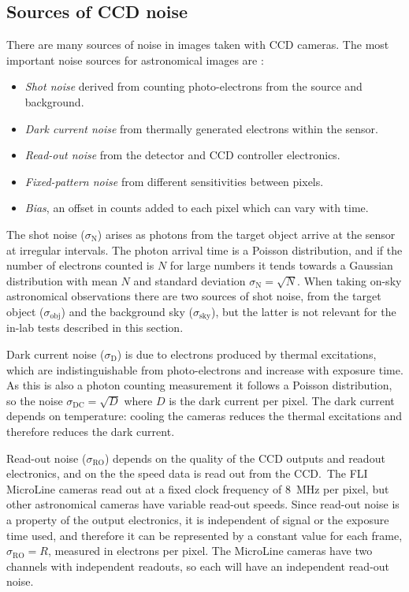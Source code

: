 \subsection{Sources of CCD noise}
\label{sec:noise}
\begin{colsection}

There are many sources of noise in images taken with CCD cameras. The most important noise sources for astronomical images are \citep{CCDs}:
%
\begin{itemize}
    \item \emph{Shot noise} derived from counting photo-electrons from the source and background.
    \item \emph{Dark current noise} from thermally generated electrons within the sensor.
    \item \emph{Read-out noise} from the detector and CCD controller electronics.
    \item \emph{Fixed-pattern noise} from different sensitivities between pixels.
    \item \emph{Bias}, an offset in counts added to each pixel which can vary with time.
\end{itemize}

The shot noise ($\sigma_\text{N}$) arises as photons from the target object arrive at the sensor at irregular intervals. The photon arrival time is a Poisson distribution, and if the number of electrons counted is $N$ for large numbers it tends towards a Gaussian distribution with mean $N$ and standard deviation $\sigma_\text{N} = \sqrt{N}$. When taking on-sky astronomical observations there are two sources of shot noise, from the target object ($\sigma_\text{obj}$) and the background sky ($\sigma_\text{sky}$), but the latter is not relevant for the in-lab tests described in this section.

Dark current noise ($\sigma_\text{D}$) is due to electrons produced by thermal excitations, which are indistinguishable from photo-electrons and increase with exposure time. As this is also a photon counting measurement it follows a Poisson distribution, so the noise $\sigma_\text{DC} = \sqrt{D}$ where $D$ is the dark current per pixel. The dark current depends on temperature: cooling the cameras reduces the thermal excitations and therefore reduces the dark current.

Read-out noise ($\sigma_\text{RO}$) depends on the quality of the CCD outputs and readout electronics, and on the the speed data is read out from the CCD.\ The FLI MicroLine cameras read out at a fixed clock frequency of \SI{8}{\mega\hertz} per pixel, but other astronomical cameras have variable read-out speeds. Since read-out noise is a property of the output electronics, it is independent of signal or the exposure time used, and therefore it can be represented by a constant value for each frame, $\sigma_\text{RO} = R$, measured in electrons per pixel. The MicroLine cameras have two channels with independent readouts, so each will have an independent read-out noise.


\end{colsection}
